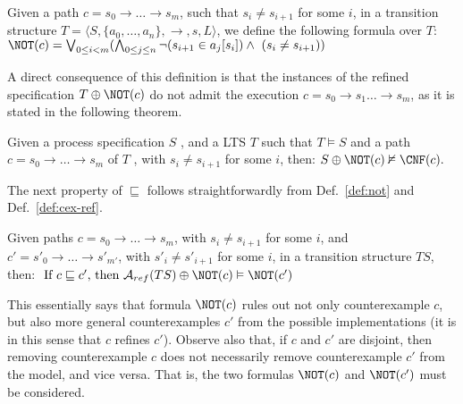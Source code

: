 \begin{definition}\label{def:not} Given a path $c = s_0 \rightarrow  \dots \rightarrow s_m$, such that $s_i \neq s_{i+1}$ for some $i$, in a transition structure $T=\langle S, \{a_0,\dots,a_n\}, \rightarrow, s, L \rangle$, we define the following formula over $T$:
$
\NOT(c) = \bigvee_{0 \leq i < m} (\bigwedge_{0 \leq j \leq n} \neg  (s_{i+1} \in a_j[s_i])  \wedge \ (s_i \neq s_{i+1}))
$
\end{definition}
A direct consequence of this definition is that the instances of the refined specification $T \oplus \NOT(c)$   do not admit the execution $c = s_0 \rightarrow s_1 \dots  \rightarrow s_m$, as it is stated in the following theorem.
\begin{theorem}\label{theorem:cex-entails} Given a process specification $S$ , and a LTS $T$ such that $T \vDash S$
and a path $c = s_0 \rightarrow  \dots \rightarrow s_m$ of $T$ , with $s_i \neq s_{i+1}$ for some $i$, then:
$
	S \oplus \NOT(c)  \nvDash \CNF(c).
$
\end{theorem}
The next property of  $\sqsubseteq$ follows straightforwardly from Def.~\ref{def:not} and Def.~\ref{def:cex-ref}.
\begin{theorem}\label{theorem:ref} Given paths $c = s_0 \rightarrow  \dots \rightarrow s_m$, with $s_i \neq s_{i+1}$ for some $i$, and $c' = s'_0 \rightarrow  \dots \rightarrow s'_{m'}$, with $s'_i \neq s'_{i+1}$ for some $i$, in a transition structure $TS$, then:
$
\text{ If } c \sqsubseteq c'\text{, then } \mathcal{A}_{ref}(TS) \oplus \NOT(c) \vDash  \NOT(c')
$
\end{theorem}
This essentially says that formula $\NOT(c)$ rules out not only counterexample $c$, but also more general counterexamples $c'$ from the possible implementations (it is in this sense that $c$ refines $c'$). Observe also that, if $c$ and $c'$ are disjoint, then removing counterexample $c$ does not necessarily remove counterexample $c'$ from the model, and vice versa. That is, the two formulas $\NOT(c)$ and $\NOT(c')$ must be considered.
